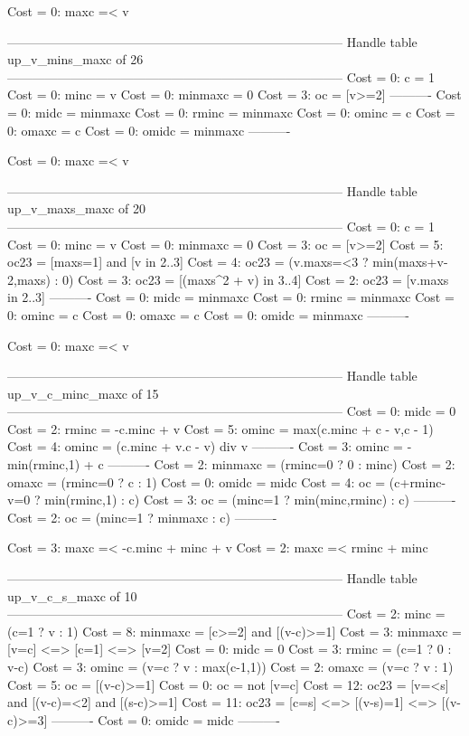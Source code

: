 Cost =  0:  maxc =< v

--------------------------------------------------------------------------------
Handle table up_v_mins_maxc of 26
--------------------------------------------------------------------------------
Cost =  0:  c       = 1
Cost =  0:  minc    = v
Cost =  0:  minmaxc = 0
Cost =  3:  oc      = [v>=2]
----------
Cost =  0:  midc    = minmaxc
Cost =  0:  rminc   = minmaxc
Cost =  0:  ominc   = c
Cost =  0:  omaxc   = c
Cost =  0:  omidc   = minmaxc
----------

Cost =  0:  maxc =< v

--------------------------------------------------------------------------------
Handle table up_v_maxs_maxc of 20
--------------------------------------------------------------------------------
Cost =  0:  c       = 1
Cost =  0:  minc    = v
Cost =  0:  minmaxc = 0
Cost =  3:  oc      = [v>=2]
Cost =  5:  oc23    = [maxs=1] and [v in 2..3]
Cost =  4:  oc23    = (v.maxs=<3 ? min(maxs+v-2,maxs) : 0)
Cost =  3:  oc23    = [(maxs^2 + v) in 3..4]
Cost =  2:  oc23    = [v.maxs in 2..3]
----------
Cost =  0:  midc    = minmaxc
Cost =  0:  rminc   = minmaxc
Cost =  0:  ominc   = c
Cost =  0:  omaxc   = c
Cost =  0:  omidc   = minmaxc
----------

Cost =  0:  maxc =< v

--------------------------------------------------------------------------------
Handle table up_v_c_minc_maxc of 15
--------------------------------------------------------------------------------
Cost =  0:  midc    = 0
Cost =  2:  rminc   = -c.minc + v
Cost =  5:  ominc   = max(c.minc + c - v,c - 1)
Cost =  4:  ominc   = (c.minc + v.c - v) div v
----------
Cost =  3:  ominc   = -min(rminc,1) + c
----------
Cost =  2:  minmaxc = (rminc=0 ? 0 : minc)
Cost =  2:  omaxc   = (rminc=0 ? c : 1)
Cost =  0:  omidc   = midc
Cost =  4:  oc      = (c+rminc-v=0 ? min(rminc,1) : c)
Cost =  3:  oc      = (minc=1 ? min(minc,rminc) : c)
----------
Cost =  2:  oc      = (minc=1 ? minmaxc : c)
----------

Cost =  3:  maxc =< -c.minc + minc + v
Cost =  2:  maxc =< rminc + minc

--------------------------------------------------------------------------------
Handle table up_v_c_s_maxc of 10
--------------------------------------------------------------------------------
Cost =  2:  minc    = (c=1 ? v : 1)
Cost =  8:  minmaxc = [c>=2] and [(v-c)>=1]
Cost =  3:  minmaxc = [v=c] <=> [c=1] <=> [v=2]
Cost =  0:  midc    = 0
Cost =  3:  rminc   = (c=1 ? 0 : v-c)
Cost =  3:  ominc   = (v=c ? v : max(c-1,1))
Cost =  2:  omaxc   = (v=c ? v : 1)
Cost =  5:  oc      = [(v-c)>=1]
Cost =  0:  oc      = not [v=c]
Cost = 12:  oc23    = [v=<s] and [(v-c)=<2] and [(s-c)>=1]
Cost = 11:  oc23    = [c=s] <=> [(v-s)=1] <=> [(v-c)>=3]
----------
Cost =  0:  omidc   = midc
----------


